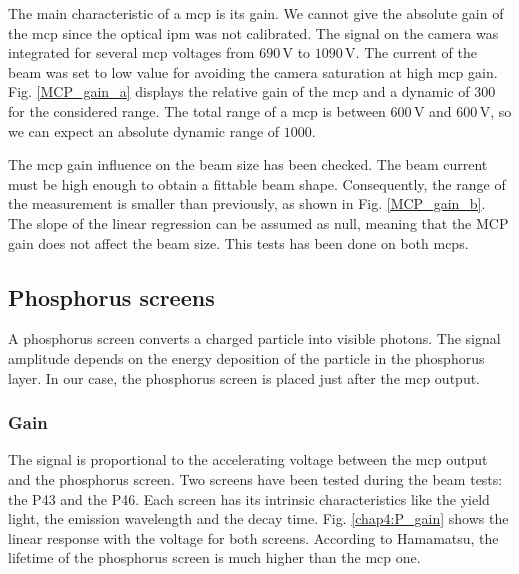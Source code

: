 \begin{refsection}
  The main characteristic of a \acrshort{mcp} is its gain. We cannot give the absolute gain of the \acrshort{mcp} since the optical \acrshort{ipm} was not calibrated. The signal on the camera was integrated for several \acrshort{mcp} voltages from $690\,\mathrm{V}$ to $1090\,\mathrm{V}$. The current of the beam was set to low value for avoiding the camera saturation at high \acrshort{mcp} gain. Fig. \ref{MCP_gain_a} displays the relative gain of the \acrshort{mcp} and a dynamic of $300$ for the considered range. The total range of a \acrshort{mcp} is between $600\,\mathrm{V}$ and $600\,\mathrm{V}$, so we can expect an absolute dynamic range of $1000$.

  The \acrshort{mcp} gain influence on the beam size has been checked. The beam current must be high enough to obtain a fittable beam shape. Consequently, the range of the measurement is smaller than previously, as shown in Fig. \ref{MCP_gain_b}. The slope of the linear regression can be assumed as null, meaning that the MCP gain does not affect the beam size. This tests has been done on both \acrshort{mcp}s.

  

  \subsection{Phosphorus screens}

  A phosphorus screen converts a charged particle into visible photons.
  The signal amplitude depends on the energy deposition of the particle in the phosphorus layer. In our case, the phosphorus screen is placed just after the \acrshort{mcp} output.

  \subsubsection{Gain}

  The signal is proportional to the accelerating voltage between the \acrshort{mcp} output and the phosphorus screen. Two screens have been tested during the beam tests: the P43 and the P46. Each screen has its intrinsic characteristics like the yield light, the emission wavelength and the decay time. Fig. \ref{chap4:P_gain} shows the linear response with the voltage for both screens. According to Hamamatsu, the lifetime of the phosphorus screen is much higher than the \acrshort{mcp} one.

  


\end{refsection}
